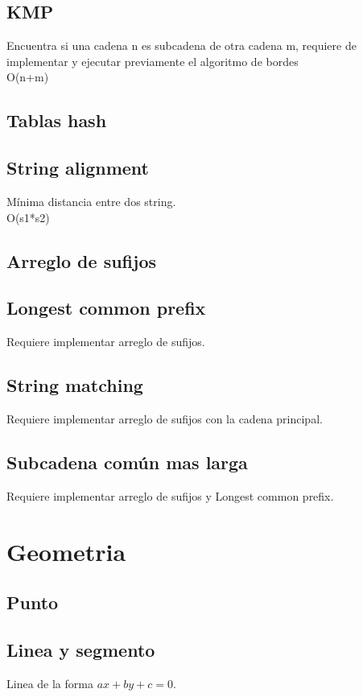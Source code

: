 \documentclass[10pt,landscape,twocolumn,letterpaper,twosided]{article}
\newcommand\cppfile[2][]{

}
\begin{document}
			\subsection{KMP}
			Encuentra si una cadena n es subcadena de otra cadena m, requiere de implementar
			y ejecutar previamente el algoritmo de bordes\\
			O(n+m)
			\cppfile[18-29]{cadenas/kmp.cpp}
			\subsection{Tablas hash}
			\cppfile[7-19]{cadenas/Hashing.cpp}
			\subsection{String alignment}
			Mínima distancia entre dos string.\\O(s1*s2)
			\cppfile[8-25]{cadenas/string_distance.cpp}
			\subsection{Arreglo de sufijos}
			\cppfile[7-48]{cadenas/Arreglo_de_sufijos.cpp}
			\subsection{Longest common prefix}
			Requiere implementar arreglo de sufijos.
			\cppfile[50-65]{cadenas/Arreglo_de_sufijos.cpp}
			\subsection{String matching}
			Requiere implementar arreglo de sufijos con la cadena principal.
			\cppfile[92-114]{cadenas/Arreglo_de_sufijos.cpp}
			\subsection{Subcadena común mas larga}
			Requiere implementar arreglo de sufijos y Longest common prefix.
			\cppfile[67-90]{cadenas/Arreglo_de_sufijos.cpp}
			
		\section{Geometria}
			\subsection{Punto}
			\cppfile[22-59]{geometria/punto.cpp}
			\subsection{Linea y segmento}
			Linea de la forma $ax + by + c = 0$.
			\cppfile[42-105]{geometria/linea.cpp}
\end{document}
